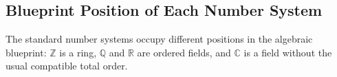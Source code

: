\subsection*{Blueprint Position of Each Number System}
\label{subsec:blueprint-position-of-each-number-system}

\begin{remark*}[Exposition]
The standard number systems occupy different positions in the algebraic
blueprint: $\mathbb{Z}$ is a ring, $\mathbb{Q}$ and $\mathbb{R}$ are ordered
fields, and $\mathbb{C}$ is a field without the usual compatible total order.
\end{remark*}

